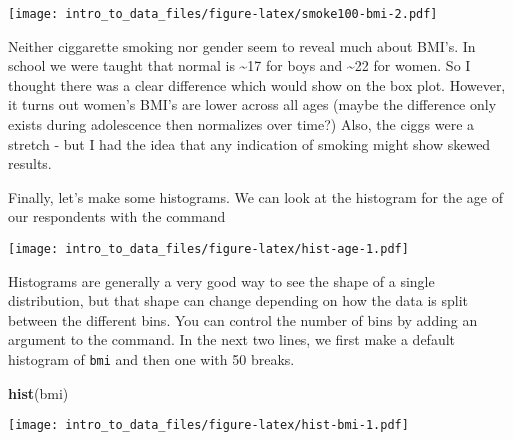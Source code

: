 \documentclass[]{article}
\newenvironment{Shaded}{\begin{snugshade}}{\end{snugshade}}
\newcommand{\KeywordTok}[1]{\textcolor[rgb]{0.13,0.29,0.53}{\textbf{#1}}}
\newcommand{\DataTypeTok}[1]{\textcolor[rgb]{0.13,0.29,0.53}{#1}}
\newcommand{\StringTok}[1]{\textcolor[rgb]{0.31,0.60,0.02}{#1}}
\newcommand{\OperatorTok}[1]{\textcolor[rgb]{0.81,0.36,0.00}{\textbf{#1}}}
\newcommand{\NormalTok}[1]{#1}
\begin{document}
\begin{Shaded}
\end{Shaded}

\texttt{[image: intro\_to\_data\_files/figure-latex/smoke100-bmi-2.pdf]}

Neither ciggarette smoking nor gender seem to reveal much about BMI's.
In school we were taught that normal is \textasciitilde{}17 for boys and
\textasciitilde{}22 for women. So I thought there was a clear difference
which would show on the box plot. However, it turns out women's BMI's
are lower across all ages (maybe the difference only exists during
adolescence then normalizes over time?) Also, the ciggs were a stretch -
but I had the idea that any indication of smoking might show skewed
results.

Finally, let's make some histograms. We can look at the histogram for
the age of our respondents with the command

\begin{Shaded}
\end{Shaded}

\texttt{[image: intro\_to\_data\_files/figure-latex/hist-age-1.pdf]}

Histograms are generally a very good way to see the shape of a single
distribution, but that shape can change depending on how the data is
split between the different bins. You can control the number of bins by
adding an argument to the command. In the next two lines, we first make
a default histogram of \texttt{bmi} and then one with 50 breaks.

\begin{Shaded}
\begin{Highlighting}[]
\KeywordTok{hist}\NormalTok{(bmi)}
\end{Highlighting}
\end{Shaded}

\texttt{[image: intro\_to\_data\_files/figure-latex/hist-bmi-1.pdf]}
\end{document}

